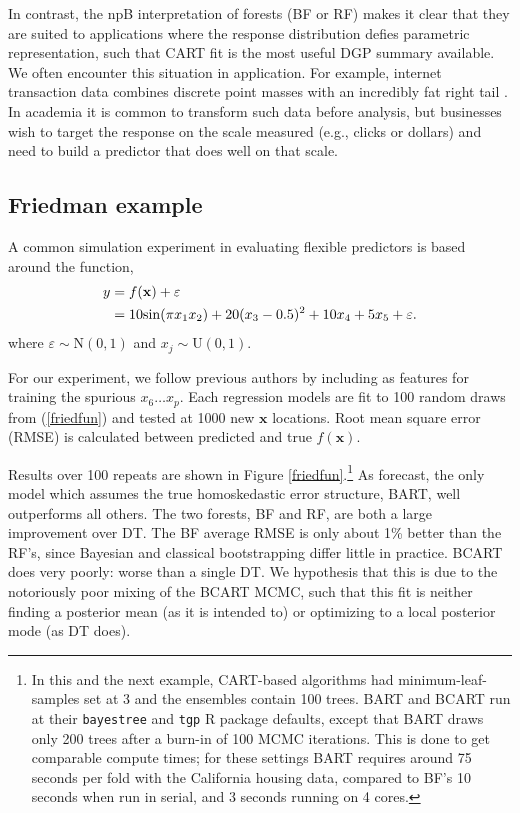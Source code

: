 \documentclass{article}
\begin{document}
In contrast, the npB interpretation of
forests (BF or RF)  makes it clear that they are suited to applications where
the response distribution defies parametric representation, such that CART fit
is the most useful DGP summary available. We  often encounter this situation in
application.  For example,  internet transaction data  combines discrete
point masses  with  an incredibly fat right tail \citep[e.g.,
see][]{taddy_heterogeneous_2014}.  In academia it is common to transform such
data before analysis, but businesses wish to target the response on the scale
measured (e.g., clicks or dollars) and  need to build a predictor that does
well on that scale.

\subsection{Friedman example}\label{friedman-example}

A common simulation experiment in evaluating flexible predictors is
based around the \citet{friedman_multivariate_1991} function,
\begin{align}\label{friedfun}
y &= f(\mathbf{x}) +  \varepsilon \\ &= 10\mathrm{sin}(\pi x_1 x_2) + 20 (x_3-0.5)^2 + 10x_4 + 5x_5 + \varepsilon.\notag
\end{align}
where $\varepsilon \sim \mathrm{N}(0,1)$ and $x_j \sim \mathrm{U}(0,1)$.

For our experiment, we follow previous authors by including as features for
training the spurious $x_6 \dots x_{p}$. Each regression models are fit to 100
random draws from (\ref{friedfun}) and tested at 1000 new $\mathbf{x}$
locations. Root mean square error (RMSE) is
calculated between predicted and true $f(\mathbf{x})$.

Results over 100 repeats are shown in  Figure \ref{friedfun}.\footnote{In this and the next example, CART-based algorithms had minimum-leaf-samples set at 3 and the ensembles contain 100 trees.  BART and BCART run at their \texttt{bayestree} and \texttt{tgp} R package defaults, except that BART draws only 200 trees after a burn-in of 100 MCMC iterations.  This is done to get comparable compute times; for these settings BART requires around 75 seconds per fold with the California housing data, compared to BF's 10 seconds when run in serial, and 3 seconds running on 4 cores.}
As forecast, the only model which assumes the true homoskedastic error
structure, BART, well outperforms all others. The two forests, BF and
RF, are both a large improvement over DT. 
The BF average RMSE is only about 1\% better than the RF's,
since Bayesian and classical bootstrapping differ little in
practice. BCART does very poorly: worse than a single DT. We
hypothesis that this is due to the notoriously poor mixing of the BCART
MCMC, such that this fit is neither finding a posterior mean (as it is
intended to) or optimizing to a local posterior mode (as DT does).
\end{document}
